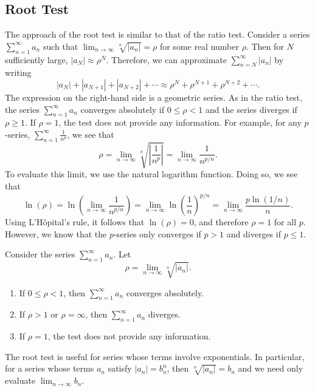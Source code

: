 \documentclass{report}
\begin{document}
    \subsection*{Root Test}
    \bigbreak \noindent 
    The approach of the root test is similar to that of the ratio test. Consider a series \(\sum_{n=1}^{\infty} a_n\) such that \(\lim_{n \to \infty} \sqrt[n]{|a_n|} = \rho\) for some real number \(\rho\). Then for \(N\) sufficiently large, \(|a_N| \approx \rho^N\). Therefore, we can approximate \(\sum_{n=N}^{\infty} |a_n|\) by writing
    \[
    |a_N| + |a_{N+1}| + |a_{N+2}| + \cdots \approx \rho^N + \rho^{N+1} + \rho^{N+2} + \cdots.
    \]
    The expression on the right-hand side is a geometric series. As in the ratio test, the series \(\sum_{n=1}^{\infty} a_n\) converges absolutely if \(0 \leq \rho < 1\) and the series diverges if \(\rho \geq 1\). If \(\rho = 1\), the test does not provide any information. For example, for any \(p\)-series, \(\sum_{n=1}^{\infty} \frac{1}{n^p}\), we see that
    \[
    \rho = \lim_{n \to \infty} \sqrt[n]{\left|\frac{1}{n^p}\right|} = \lim_{n \to \infty} \frac{1}{n^{p/n}}.
    \]
    To evaluate this limit, we use the natural logarithm function. Doing so, we see that
    \[
    \ln(\rho) = \ln\left(\lim_{n \to \infty} \frac{1}{n^{p/n}}\right) = \lim_{n \to \infty} \ln\left(\frac{1}{n}\right)^{p/n} = \lim_{n \to \infty} \frac{p \ln(1/n)}{n}.
    \]
    Using L'Hôpital's rule, it follows that \(\ln(\rho) = 0\), and therefore \(\rho = 1\) for all \(p\). However, we know that the \(p\)-series only converges if \(p > 1\) and diverges if \(p \leq 1\).

    \pagebreak \bigbreak \noindent 
    \begin{thrm}
        Consider the series \(\sum_{n=1}^{\infty} a_n\). Let
        \[
        \rho = \lim_{n \to \infty} \sqrt[n]{|a_n|}.
        \]
        \begin{enumerate}[label=\roman*.]
            \item If \(0 \leq \rho < 1\), then \(\sum_{n=1}^{\infty} a_n\) converges absolutely. 
            \item If \(\rho > 1\) or \(\rho = \infty\), then \(\sum_{n=1}^{\infty} a_n\) diverges. 
            \item If \(\rho = 1\), the test does not provide any information.
        \end{enumerate}
    \end{thrm}
    \bigbreak \noindent 
    The root test is useful for series whose terms involve exponentials. In particular, for a series whose terms \(a_n\) satisfy \(|a_n| = b_n^n\), then \(\sqrt[n]{|a_n|} = b_n\) and we need only evaluate \(\lim_{n \to \infty} b_n\).

    

        

    

    
    

   


   
   
   

   

    
 




    


    

        
\end{document}
